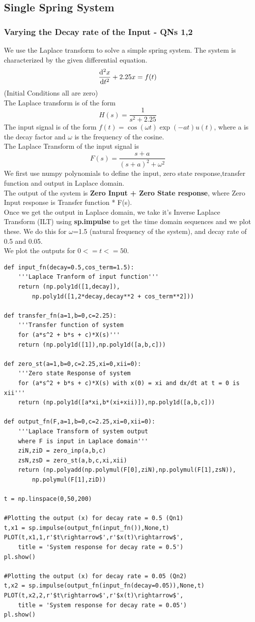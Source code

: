 \documentclass[11pt, a4paper]{article}
\begin{document}
\subsection{Single Spring System}
\subsubsection{Varying the Decay rate of the Input - QNs 1,2}
{
We use the Laplace transform to solve a simple spring system.
The system is characterized by the given differential equation.
\[\dv[2]{x}{t} + 2.25x = f(t) \]
(Initial Conditions all are zero)\\
The Laplace transform is of the form
\[H(s) =  \frac{1}{s^2+2.25}\]
The input signal is of the form 
\(f(t) = \cos{(\omega t)}\exp(-at)u(t)\),
where a is the decay factor and $\omega$ is the frequency of the cosine.\\
The Laplace Transform of the input signal is
\[ F(s) = \frac{s+a}{(s+a)^2+\omega^2 }\]
We first use numpy polynomials to define the input, zero state response,transfer function and output in Laplace domain. 
\\The output of the system is \textbf{Zero Input + Zero State response}, where Zero Input response is Transfer function * F(s).
\\Once we get the output in Laplace domain, we take it's Inverse Laplace Transform (ILT) using \textbf{sp.impulse} to get the time domain sequences and we plot these.
We do this for $\omega$=1.5 (natural frequency of the system), and decay rate of 0.5 and 0.05.
\\We plot the outputs for $0 <= t <= 50$.
}
\begin{verbatim}
def input_fn(decay=0.5,cos_term=1.5):
	'''Laplace Tranform of input function'''
	return (np.poly1d([1,decay]),
		np.poly1d([1,2*decay,decay**2 + cos_term**2]))

def transfer_fn(a=1,b=0,c=2.25):
	'''Transfer function of system
	for (a*s^2 + b*s + c)*X(s)'''
	return (np.poly1d([1]),np.poly1d([a,b,c]))

def zero_st(a=1,b=0,c=2.25,xi=0,xii=0):
	'''Zero state Response of system
	for (a*s^2 + b*s + c)*X(s) with x(0) = xi and dx/dt at t = 0 is xii'''
	return (np.poly1d([a*xi,b*(xi+xii)]),np.poly1d([a,b,c]))

def output_fn(F,a=1,b=0,c=2.25,xi=0,xii=0):
	'''Laplace Transform of system output
	where F is input in Laplace domain'''
	ziN,ziD = zero_inp(a,b,c)
	zsN,zsD = zero_st(a,b,c,xi,xii)
	return (np.polyadd(np.polymul(F[0],ziN),np.polymul(F[1],zsN)),
		np.polymul(F[1],ziD))

t = np.linspace(0,50,200)

#Plotting the output (x) for decay rate = 0.5 (Qn1)
t,x1 = sp.impulse(output_fn(input_fn()),None,t)
PLOT(t,x1,1,r'$t\rightarrow$',r'$x(t)\rightarrow$',
	title = 'System response for decay rate = 0.5')
pl.show()

#Plotting the output (x) for decay rate = 0.05 (Qn2)
t,x2 = sp.impulse(output_fn(input_fn(decay=0.05)),None,t)
PLOT(t,x2,2,r'$t\rightarrow$',r'$x(t)\rightarrow$',
	title = 'System response for decay rate = 0.05')
pl.show()

\end{verbatim}
\end{document}
